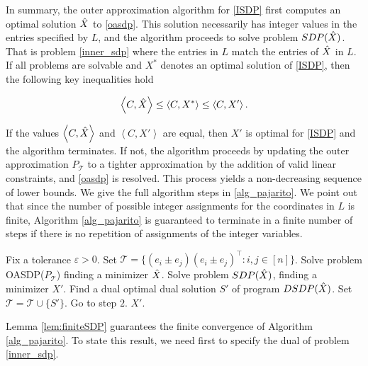 \documentclass{article}
\begin{document}
In summary, the outer approximation algorithm for \eqref{ISDP} first computes an optimal solution $\Hat{X}$ to \eqref{oasdp}. This solution necessarily has integer values in the entries specified by $L$, and the algorithm proceeds to solve problem $SDP(\Hat{X})$. That is problem \eqref{inner_sdp} where the entries in $L$ match the entries of $\Hat{X}$ in $L$. If all problems are solvable and $X^*$ denotes an optimal solution of \eqref{ISDP}, then the following key inequalities hold

\begin{equation}
\left \langle C, \Hat{X} \right \rangle \leq \left \langle C, X^* \right \rangle \leq \left \langle C, X' \right \rangle.
\end{equation}

If the values $\left \langle C, \Hat{X} \right \rangle$ and 
$\left \langle C, X' \right \rangle$ are equal, then $X'$ is optimal for \eqref{ISDP} and the algorithm terminates. If not, the algorithm proceeds by updating the outer approximation $P_\mathcal{T}$ to a tighter approximation by the addition of valid linear constraints, and \eqref{oasdp} is resolved. This process yields a non-decreasing sequence of lower bounds. We give the full algorithm steps in \ref{alg_pajarito}. We point out that since the number of possible integer assignments for the coordinates in $L$ is finite, Algorithm \ref{alg_pajarito} is guaranteed to terminate in a finite number of steps if there is no repetition of assignments of the integer variables.


\begin{algorithm}
\caption{Outer Approximation (SDP)}
\label{alg_pajarito}
\begin{algorithmic}[1]
\State Fix a tolerance $\varepsilon>0$.  
Set $\mathcal{T} = \{(e_i\pm e_j)(e_i\pm e_j)^\top: i,j \in [n]\}$.
 \State Solve problem OASDP($P_\mathcal{T}$) finding a minimizer $\Hat{X}$. 
\State Solve problem $SDP(\Hat{X})$, finding a minimizer $X'$.
\State Find a dual optimal dual solution $S'$ of program $DSDP(\Hat{X})$. 
\State Set $\mathcal{T} = \mathcal{T} \cup \{S'\}$. Go to step $2$.
\EndIf
\Return $X'$.
\end{algorithmic}
\end{algorithm}

Lemma \ref{lem:finiteSDP} guarantees the finite convergence of Algorithm \ref{alg_pajarito}. To state this result, we need first to specify the dual of problem \eqref{inner_sdp}.
\end{document}
